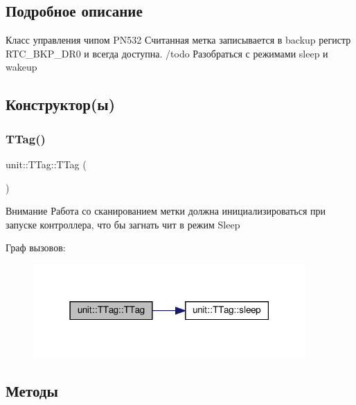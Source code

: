\subsection{Подробное описание}
Класс управления чипом P\+N532 Считанная метка записывается в backup регистр R\+T\+C\+\_\+\+B\+K\+P\+\_\+\+D\+R0 и всегда доступна. /todo Разобраться с режимами sleep и wakeup 

\subsection{Конструктор(ы)}
\mbox{\label{classunit_1_1_t_tag_afc2c7b675721b1577270b70a5dc02649}} 
\subsubsection{\texorpdfstring{T\+Tag()}{TTag()}}
{\footnotesize\ttfamily unit\+::\+T\+Tag\+::\+T\+Tag (\begin{DoxyParamCaption}{ }\end{DoxyParamCaption})}



 \begin{DoxyAttention}{Внимание}
Работа со сканированием метки должна инициализироваться при запуске контроллера, что бы загнать чит в режим Sleep 
\end{DoxyAttention}
Граф вызовов\+:\nopagebreak
\begin{figure}[H]
\begin{center}
\leavevmode
\includegraphics[width=295pt]{classunit_1_1_t_tag_afc2c7b675721b1577270b70a5dc02649_cgraph}
\end{center}
\end{figure}


\subsection{Методы}
\mbox{\label{classunit_1_1_t_tag_a90fba846800afa1b828d81f079ba735e}} 
